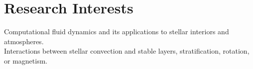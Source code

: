 \section{Research Interests}

Computational fluid dynamics and its applications to stellar interiors and atmospheres. \\
Interactions between stellar convection and stable layers, stratification, rotation, or magnetism.

